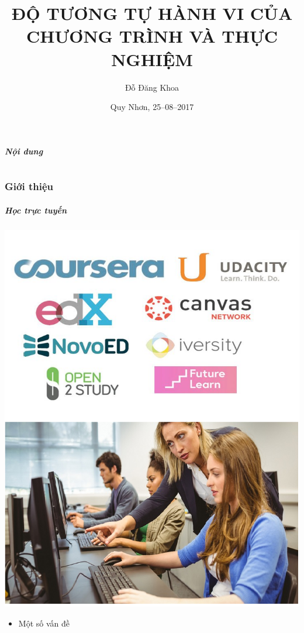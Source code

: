 \documentclass{beamer}
\title{ĐỘ TƯƠNG TỰ HÀNH VI CỦA CHƯƠNG TRÌNH VÀ THỰC NGHIỆM}
\author{Đỗ Đăng Khoa}
\institute{KHMT K19 -- ĐHQN}
\date{Quy Nhơn, 25--08--2017}
\begin{document}
\begin{frame}
  \titlepage
\end{frame}

\begin{frame}
  \frametitle{Nội dung}
  \tableofcontents
\end{frame}

\part{}

\section{Giới thiệu}
\begin{frame}
  \frametitle{Học trực tuyến}
  \begin{minipage}{0.39\linewidth}
    \includegraphics[width=0.9\linewidth]{images/topMOOC.png}
  \end{minipage}
  \hfill
  \begin{minipage}{0.59\linewidth}
    \begin{itemize}
    \item Một số vấn đề

\end{itemize}
\end{minipage}
\end{frame}
\end{document}
